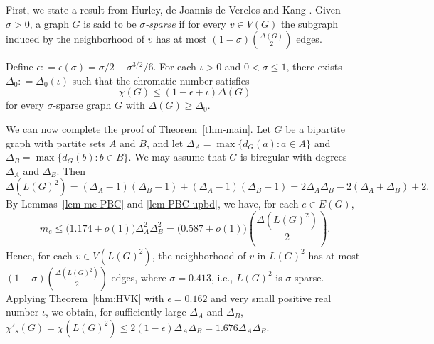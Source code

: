 \documentclass[11pt]{amsart}
\begin{document}
First, we state a result  from Hurley, de Joannis de Verclos and Kang \cite{HurleyJoannisKang2022ImprovedProcedure}. %
Given $\sigma >0$, a graph $G$ is said to be {\it  $\sigma$-sparse} if for every $v\in V(G)$ the subgraph induced by the neighborhood of $v$ has at most $(1-\sigma)\binom{\Delta(G)}{2}$ edges. 

\begin{theorem}  \label{thm:HVK} Define $\epsilon: =\epsilon(\sigma) = \sigma/2 -\sigma^{3/2}/6$. For each $\iota>0$ and $0 < \sigma \le 1$, there exists $\Delta_{0}: =\Delta_{0}(\iota)$ such that the chromatic number satisfies $$\chi(G) \le (1 -\epsilon+\iota)\Delta(G)$$ for every $\sigma$-sparse graph $G$ with $\Delta(G) \ge \Delta_{0}$. 
\end{theorem}

We can now complete the proof of Theorem~\ref{thm-main}. Let $G$ be a bipartite graph with partite sets $A$ and $B$, and let $\Delta_A=\max \{d_G(a): a\in A\}$ and $\Delta_B=\max\{d_G(b):b\in B\}$. We may assume that $G$ is biregular with degrees $\Delta_A$ and $\Delta_B$. Then 
$$\Delta(L(G)^2)=(\Delta_A-1)(\Delta_B-1)+(\Delta_A-1)(\Delta_B-1)=2\Delta_A\Delta_B-2(\Delta_A+\Delta_B)+2.$$  
By Lemmas~\ref{lem me PBC} and \ref{lem PBC upbd}, we have, for each $e\in E(G)$, 
\begin{equation*}\label{ine6}
    m_e\le \big(1.174+o(1)\big)\Delta_A^2\Delta_B^2=\big(0.587+o(1)\big){\Delta(L(G)^2)\choose 2}. 
\end{equation*}
Hence, for each $v\in V(L(G)^2)$, the neighborhood of $v$ in $L(G)^2$ has at most $(1-\sigma){\Delta(L(G)^2)\choose 2}$ edges, where $\sigma=0.413$, i.e., $L(G)^2$ is $\sigma$-sparse. Applying Theorem~\ref{thm:HVK} with  $\epsilon=0.162$ and  very small positive real number $\iota$, we obtain, for sufficiently large $\Delta_A$ and $\Delta_B$,   $\chi'_s(G)=\chi(L(G)^2) \le 2(1-\epsilon)\Delta_A\Delta_B=1.676\Delta_A\Delta_B$.
\end{document}
